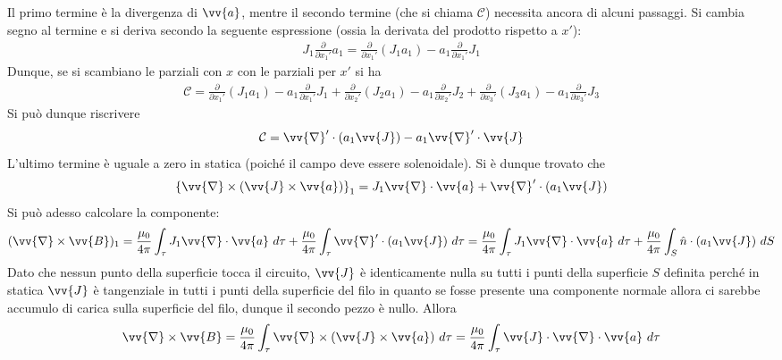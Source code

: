 \documentclass[a4paper, oneside]{article}
\begin{document}
Il primo termine è la divergenza di $\vv{a}$, mentre il secondo termine (che si chiama $\mathcal{C}$) necessita ancora di 
alcuni passaggi.  Si cambia segno al termine e si deriva secondo la seguente espressione (ossia la derivata
del prodotto rispetto a $x'$):
\begin{gather*}
    J_1 \frac{\partial }{\partial x_1'} a_1 = \frac{\partial }{\partial x_1'}(J_1 a_1) - a_1 \frac{\partial }{\partial x_1'}J_1     
\end{gather*}
Dunque, se si scambiano le parziali con $x$ con le parziali per $x'$ si ha 
\begin{gather*}
    \mathcal{C}  = \frac{\partial }{\partial x_1'}(J_1 a_1) -a_1 \frac{\partial }{\partial x_1'}J_1 + \frac{\partial }{\partial x_2'}(J_2 a_1) - a_1 \frac{\partial }{\partial x_2'}J_2 + \frac{\partial }{\partial x_3'}(J_3 a_1) - a_1\frac{\partial }{\partial x_3'} J_3       
\end{gather*}
Si può dunque riscrivere
\begin{gather*}
    \mathcal{C} = \vv{\nabla}' \cdot \left(a_1 \vv{J} \right) - a_1 \vv{\nabla}' \cdot \vv{J}  
\end{gather*}
L'ultimo termine è uguale a zero in statica (poiché il campo deve essere solenoidale). 
Si è dunque trovato che
\begin{gather*}
    \left\{ \vv{\nabla} \times \left(\vv{J} \times \vv{a}  \right) \right\}_1 = J_1 \vv{\nabla} \cdot \vv{a} + \vv{\nabla}' \cdot (a_1 \vv{J} )   
\end{gather*}
Si può adesso calcolare la componente:
\begin{gather*}
    (\vv{\nabla} \times \vv{B})_1  = \frac{\mu_0}{4\pi} \int_{\tau} J_1 \vv{\nabla} \cdot \vv{a} \ d\tau + \frac{\mu_0}{4\pi} \int_{\tau} \vv{\nabla}' \cdot (a_1 \vv{J} )  \ d\tau  = \frac{\mu_0}{4\pi} \int_{\tau} J_1 \vv{\nabla} \cdot \vv{a} \ d\tau +\frac{\mu_0}{4\pi} \int_{S} \hat{n} \cdot (a_1 \vv{J} ) \ dS  
\end{gather*}
Dato che nessun punto della superficie tocca il circuito, $\vv{J}$ è identicamente nulla su tutti i punti 
della superficie $S$ definita perché in statica $\vv{J}$ è tangenziale in tutti i punti della superficie del filo 
in quanto se fosse presente una componente normale allora ci sarebbe accumulo di carica 
sulla superficie del filo, dunque il secondo pezzo è nullo. Allora 
\begin{align}
    \vv{\nabla} \times \vv{B} = \frac{\mu_0}{4\pi} \int_{\tau} \vv{\nabla} \times (\vv{J} \times \vv{a}  ) \ d\tau = \frac{\mu_0}{4\pi} \int_{\tau} \vv{J} \cdot \vv{\nabla} \cdot \vv{a} \ d\tau         
\end{align}  
\end{document}
